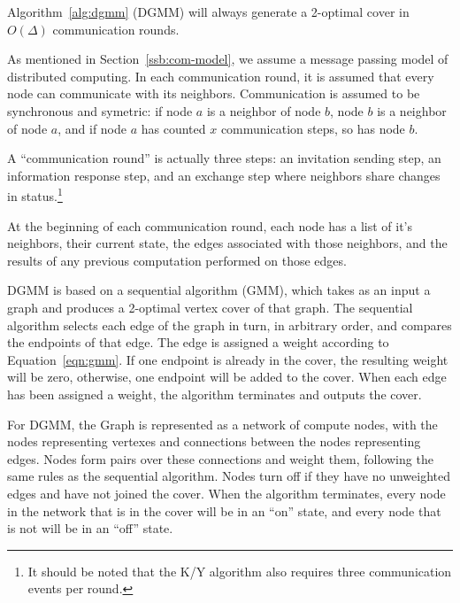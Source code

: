 \begin{thm}
  Algorithm~\ref{alg:dgmm} (DGMM) will always generate a 2-optimal cover in $O(\Delta)$ communication rounds.
\label{thm:dgmm-term}
\end{thm}

\begin{note}
\label{not:com-model}
As mentioned in Section~\ref{ssb:com-model}, we assume a message passing model of distributed computing. In each communication round, it is assumed that every node can communicate with its neighbors. Communication is assumed to be synchronous and symetric: if node $a$ is a neighbor of node $b$, node $b$ is a neighbor of node $a$, and if node $a$ has counted $x$ communication steps, so has node $b$.

A ``communication round'' is actually three steps: an invitation sending step, an information response step, and an exchange step where neighbors share changes in status.\footnote{It should be noted that the K/Y algorithm also requires three communication events per round.} 
\end{note}
\begin{note}
\label{not:dgmm-local-info}
At the beginning of each communication round, each node has a list of it's neighbors, their current state, the edges associated with those neighbors, and the results of any previous computation performed on those edges.
\end{note}
\begin{note}
\label{not:gmm-dgmm}
DGMM is based on a sequential algorithm (GMM), which takes as an input a graph and produces a 2-optimal vertex cover of that graph. The sequential algorithm selects each edge of the graph in turn, in arbitrary order, and compares the endpoints of that edge. The edge is assigned a weight according to Equation~\ref{eqn:gmm}. If one endpoint is already in the cover, the resulting weight will be zero, otherwise, one endpoint will be added to the cover. When each edge has been assigned a weight, the algorithm terminates and outputs the cover.

For DGMM, the Graph is represented as a network of compute nodes, with the nodes representing vertexes and connections between the nodes representing edges. Nodes form pairs over these connections and weight them, following the same rules as the sequential algorithm. Nodes turn off if they have no unweighted edges and have not joined the cover. When the algorithm terminates, every node in the network that is in the cover will be in an ``on'' state, and every node that is not will be in an ``off'' state.
\end{note}
